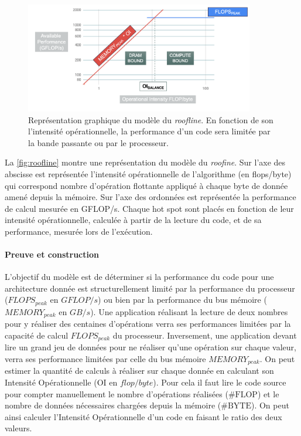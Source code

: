 \begin{figure}
    \center
    \includegraphics[width=10cm]{images/roofline.png}
    \caption{\label{fig:roofline} Représentation graphique du modèle du \textit{roofline}. En fonction de son l'intensité opérationnelle, la performance d'un code sera limitée par la bande passante ou par le processeur.}
\end{figure}


La \autoref{fig:roofline} montre une représentation du modèle du \textit{roofine}. Sur l’axe des abscisse est représentée l’intensité opérationnelle de l’algorithme (en flops/byte) qui correspond nombre d’opération flottante appliqué à chaque byte de donnée amené depuis la mémoire. Sur l’axe des ordonnées est représentée la performance de calcul mesurée en GFLOP/s.
Chaque hot spot sont placés en fonction de leur intensité opérationnelle, calculée à partir de la lecture du code, et de sa performance, mesurée lors de l’exécution.

\paragraph{Preuve et construction}
L’objectif du modèle est de déterminer si la performance du code pour une architecture donnée est structurellement limité par la performance du processeur ($FLOPS_{peak}$ en $GFLOP/s$) ou bien par la performance du bus mémoire ($MEMORY_{peak}$ en $GB/s$). Une application réalisant la lecture de deux nombres pour y réaliser des centaines d’opérations verra ses performances limitées par la capacité de calcul $FLOPS_{peak}$ du processeur. Inversement, une application devant lire un grand jeu de données pour ne réaliser qu'une opération sur chaque valeur, verra ses performance limitées par celle du bus mémoire $MEMORY_{peak}$. On peut estimer la quantité de calculs à réaliser sur chaque donnée en calculant son Intensité Opérationnelle  ($\text{OI}$ en $flop/byte$). Pour cela il faut lire le code source pour compter manuellement le nombre d’opérations réalisées ($\text{\#FLOP}$) et le nombre de données nécessaires chargées depuis la mémoire ($\text{\#BYTE}$). On peut ainsi calculer l’Intensité Opérationnelle d’un code en faisant le ratio des deux valeurs.

